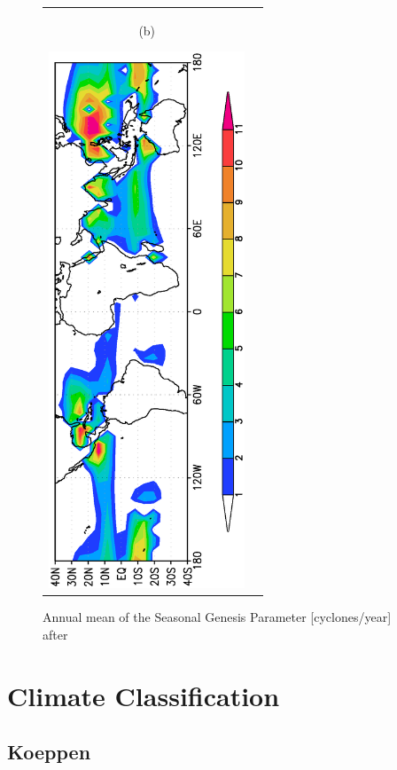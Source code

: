\documentclass[12pt,a4paper,twoside,openright,headinclude,liststotoc,bibtotoc]{scrreprt}
\begin{document}
\begin{figure}[c]
\begin{tabular}{cc}
\begin{minipage}{1.0\textwidth}
\begin{center}
\begin{scriptsize}(b)\end{scriptsize}\hspace{-1.28cm}\includegraphics[height=16.0cm,angle=-90]{eps/ERAsgpanm.eps}
\end{center}
\end{minipage}
\end{tabular}
\vspace{-1.2cm}\caption[Annual mean Seasonal Genesis Parameter]{Annual mean of the Seasonal Genesis Parameter [cyclones/year] after \citet{Gray1975}}
\label{img:sgp}
\end{figure}


\newpage

\vspace{-0.4cm}
\chapter{Climate Classification}\label{classi}
\vspace{-0.4cm}
\section{Koeppen}
\vspace{-0.4cm}
\end{document}
